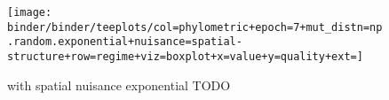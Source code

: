 \begin{figure*}
  \centering
  \texttt{[image: binder/binder/teeplots/col=phylometric+epoch=7+mut\_distn=np.random.exponential+nuisance=spatial-structure+row=regime+viz=boxplot+x=value+y=quality+ext=]}
  \caption{with spatial nuisance exponential TODO}
  \label{fig:reconstructed-tree-phylometrics-with-spatial-nuisance-exponential}
\end{figure*}
